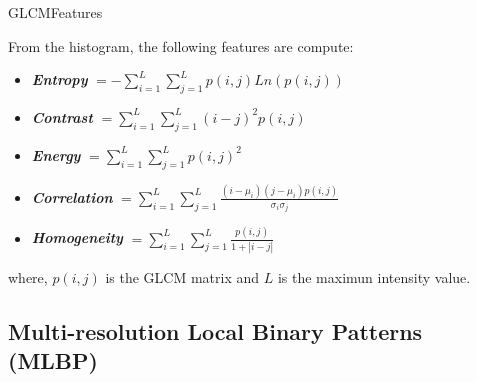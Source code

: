 \documentclass[10pt]{beamer}
\newcommand{\1}{
	\setbeamertemplate{background}{
		\texttt{[image: img/1]}
		\tikz[overlay] \fill[fill opacity=0.75,fill=white] (0,0) rectangle (-\paperwidth,\paperheight);
	}
}
\begin{document}
\begin{frame}{GLCM}{Features}
	\begin{block}{}
		From the histogram, the following features are compute:
		\begin{itemize}
			\item \textbf{\textit{Entropy}} $ = -\sum_{i=1}^{L}\sum_{j=1}^{L} p(i, j)Ln(p(i,j))$
			\item \textbf{\textit{Contrast}} $  =  \sum_{i=1}^{L}\sum_{j=1}^{L} (i-j)^2 p(i, j)$
			\item \textbf{\textit{Energy}} $ =  \sum_{i=1}^{L}\sum_{j=1}^{L} p(i,j)^2$
			\item \textbf{\textit{Correlation}} $ =  \sum_{i=1}^{L}\sum_{j=1}^{L}  \frac{ (i - \mu_i)(j - \mu_i)p(i, j)  }{ \sigma_i \sigma_j }     $
			\item \textbf{\textit{Homogeneity}} $ =  \sum_{i=1}^{L}\sum_{j=1}^{L}  \frac{ p(i, j) }{ 1 + | i - j | }    $
		\end{itemize}
	\end{block}
	
	\begin{block}{}
		where, $p(i, j)$ is the GLCM matrix and $L$ is the maximun intensity value.
		
	\end{block}
\end{frame}



\subsection{Multi-resolution Local Binary Patterns (MLBP)}
\end{document}
